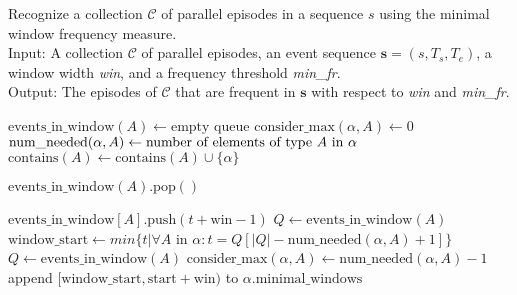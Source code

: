 \begin{algorithm}

\caption{Recognize a collection $ \mathcal{C} $ of parallel episodes in a sequence $ s $ using the minimal window frequency measure. \\
Input: A collection $ \mathcal{C} $ of parallel episodes, an event sequence $ \boldsymbol{s} = (s, T_s, T_e) $, a window width \textit{win}, and a frequency threshold \textit{min\_fr}. \\
Output: The episodes of $ \mathcal{C} $ that are frequent in $ \boldsymbol{s} $ with respect to \textit{win} and \textit{min\_fr}.}

\begin{algorithmic}[1]

    \State $ \text{events\_in\_window}(A) \gets \text{empty queue} $
\EndFor
{}
        \State $ \text{consider\_max}(\alpha, A) \gets 0 $
        \State $ \text{num\_needed}(\alpha, A) \gets \text{number of elements of type $ A $ in $ \alpha $} $
        \State $ \text{contains}(A) \gets \text{contains}(A) \cup \{ \alpha \} $
    \EndFor
\EndFor

            \State $ \text{events\_in\_window}(A) \text{.pop}() $
        \EndWhile
    \EndFor

        \State $ \text{events\_in\_window}[A] \text{.push}(t + \text{win} - 1) $
                \State $ Q \gets \text{events\_in\_window}(A) $
                \State $ \text{window\_start} \gets min\{ t | \forall A $ in $ \alpha : t = Q[| Q | - \text{num\_needed}(\alpha, A) + 1] \} $
                    $ Q \gets \text{events\_in\_window}(A) $
                        \State $ \text{consider\_max}(\alpha, A) \gets \text{num\_needed}(\alpha, A) - 1 $
                    \EndIf
                    \State append $ [\text{window\_start}, \text{start} + \text{win}) $ to $ \alpha \text{.minimal\_windows} $
                \EndFor
            \EndIf
        \EndFor
    \EndFor
\EndFor

\end{algorithmic}

\end{algorithm}

